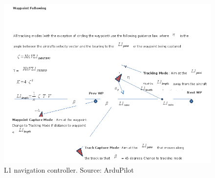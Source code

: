 \begin{figure}[H]
\centering
  \includegraphics[width=0.8\linewidth]{figs/l1.png}	
  \caption{L1 navigation controller. Source: ArduPilot}
  \label{fig:l1_loop}
\end{figure}

